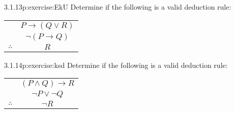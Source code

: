 \documentclass[twoside,11pt,]{book}
\newcommand{\tabularfont}{\relax}
\numberwithin{equation}{chapter}
\newcommand{\hrulethin}  {\noalign{\hrule height 0.04em}}
\newcommand{\imp}{\rightarrow}
\begin{document}
\begin{divisionsolution}{3.1.13}{}{p:exercise:EkU}%
Determine if the following is a valid deduction rule:%
\begin{sidebyside}{1}{0}{0}{0}%
\begin{sbspanel}{1}%
{\centering%
{\tabularfont%
\begin{tabular}{cc}
&\(P \imp (Q \vee R)\)\tabularnewline[0pt]
&\(\neg(P \imp Q)\)\tabularnewline\hrulethin
\(\therefore\)&\(R\)
\end{tabular}
}%
\par}
\end{sbspanel}%
\end{sidebyside}%
\end{divisionsolution}%
\begin{divisionsolution}{3.1.14}{}{p:exercise:ksd}%
Determine if the following is a valid deduction rule:%
\begin{sidebyside}{1}{0}{0}{0}%
\begin{sbspanel}{1}%
{\centering%
{\tabularfont%
\begin{tabular}{cc}
&\((P \wedge Q) \imp R\)\tabularnewline[0pt]
&\(\neg P \vee \neg Q\)\tabularnewline\hrulethin
\(\therefore\)&\(\neg R\)
\end{tabular}
}%
\par}
\end{sbspanel}%
\end{sidebyside}%
\end{divisionsolution}%
\end{document}
